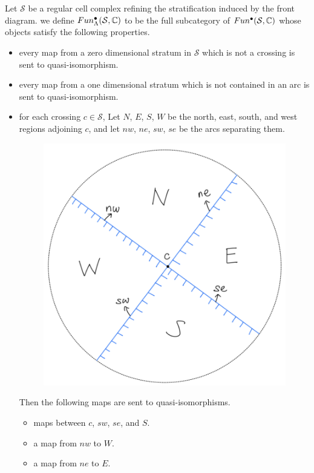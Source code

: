 \begin{definition}
Let $\mathcal{S}$ be a regular cell complex refining the stratification induced by the front diagram. we define $Fun^\bullet_\Lambda(\mathcal{S},\mathbb{C})$ to be the full subcategory of $Fun^\bullet(\mathcal{S},\mathbb{C})$ whose objects satisfy the following properties.
\begin{itemize}
\item every map from a zero dimensional stratum in $\mathcal{S}$ which is not a crossing is sent to quasi-isomorphism.

\item every map from a one dimensional stratum which is not contained in an arc is sent to quasi-isomorphism.

\item for each crossing $c\in \mathcal{S}$, Let $N$, $E$, $S$, $W$ be the north, east, south, and west regions adjoining $c$, and let $nw$, $ne$, $sw$, $se$ be the arcs separating them.
\begin{figure}[H] 
    \centering
    \includegraphics[scale = 0.95]{diagrams/intro/1.png}
    \caption{}
    \label{fig:your-label}
\end{figure}
Then the following maps are sent to quasi-isomorphisms.
\begin{itemize}
\item maps between $c$, $sw$, $se$, and $S$.
\item a map from $nw$ to $W$.
\item a map from $ne$ to $E$.
\end{itemize}


\end{itemize}
\end{definition}
